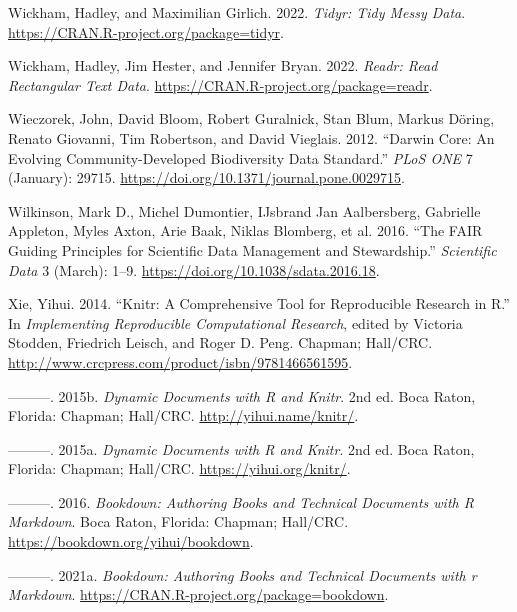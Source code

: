 \documentclass[
]{book}
\newlength{\cslhangindent}
\newlength{\cslentryspacingunit} %
\newenvironment{CSLReferences}[2] %
 {%
  \setlength{\parindent}{0pt}
  \ifodd #1
  \let\oldpar\par
  \def\par{\hangindent=\cslhangindent\oldpar}
  \fi
  \setlength{\parskip}{#2\cslentryspacingunit}
 }%
 {}
\begin{document}
\begin{CSLReferences}{1}{0}
\leavevmode{}%
Wickham, Hadley, and Maximilian Girlich. 2022. \emph{Tidyr: Tidy Messy Data}. \url{https://CRAN.R-project.org/package=tidyr}.

\leavevmode{}%
Wickham, Hadley, Jim Hester, and Jennifer Bryan. 2022. \emph{Readr: Read Rectangular Text Data}. \url{https://CRAN.R-project.org/package=readr}.

\leavevmode{}%
Wieczorek, John, David Bloom, Robert Guralnick, Stan Blum, Markus Döring, Renato Giovanni, Tim Robertson, and David Vieglais. 2012. {``Darwin Core: An Evolving Community-Developed Biodiversity Data Standard.''} \emph{PLoS ONE} 7 (January): 29715. \url{https://doi.org/10.1371/journal.pone.0029715}.

\leavevmode{}%
Wilkinson, Mark D., Michel Dumontier, IJsbrand Jan Aalbersberg, Gabrielle Appleton, Myles Axton, Arie Baak, Niklas Blomberg, et al. 2016. {``The FAIR Guiding Principles for Scientific Data Management and Stewardship.''} \emph{Scientific Data} 3 (March): 1--9. \url{https://doi.org/10.1038/sdata.2016.18}.

\leavevmode{}%
Xie, Yihui. 2014. {``Knitr: A Comprehensive Tool for Reproducible Research in {R}.''} In \emph{Implementing Reproducible Computational Research}, edited by Victoria Stodden, Friedrich Leisch, and Roger D. Peng. Chapman; Hall/CRC. \url{http://www.crcpress.com/product/isbn/9781466561595}.

\leavevmode{}%
---------. 2015b. \emph{Dynamic Documents with {R} and Knitr}. 2nd ed. Boca Raton, Florida: Chapman; Hall/CRC. \url{http://yihui.name/knitr/}.

\leavevmode{}%
---------. 2015a. \emph{Dynamic Documents with {R} and Knitr}. 2nd ed. Boca Raton, Florida: Chapman; Hall/CRC. \url{https://yihui.org/knitr/}.

\leavevmode{}%
---------. 2016. \emph{Bookdown: Authoring Books and Technical Documents with {R} Markdown}. Boca Raton, Florida: Chapman; Hall/CRC. \url{https://bookdown.org/yihui/bookdown}.

\leavevmode{}%
---------. 2021a. \emph{Bookdown: Authoring Books and Technical Documents with r Markdown}. \url{https://CRAN.R-project.org/package=bookdown}.


\end{CSLReferences}
\end{document}
